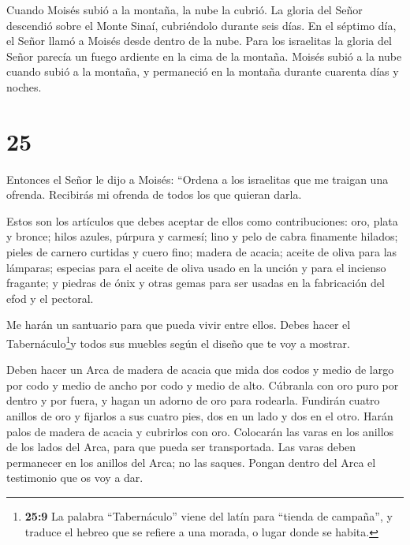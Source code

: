  Cuando Moisés subió a la montaña, la nube la cubrió.
 La gloria del Señor descendió sobre el Monte Sinaí,
cubriéndolo durante seis días. En el séptimo día, el Señor llamó a
Moisés desde dentro de la nube.  Para los israelitas la
gloria del Señor parecía un fuego ardiente en la cima de la montaña.
 Moisés subió a la nube cuando subió a la montaña, y
permaneció en la montaña durante cuarenta días y noches.

\hypertarget{section-24}{%
\section{25}\label{section-24}}

 Entonces el Señor le dijo a Moisés:  ``Ordena a
los israelitas que me traigan una ofrenda. Recibirás mi ofrenda de todos
los que quieran darla.

 Estos son los artículos que debes aceptar de ellos como
contribuciones: oro, plata y bronce;  hilos azules, púrpura
y carmesí; lino y pelo de cabra finamente hilados;  pieles
de carnero curtidas y cuero fino; madera de acacia;  aceite
de oliva para las lámparas; especias para el aceite de oliva usado en la
unción y para el incienso fragante;  y piedras de ónix y
otras gemas para ser usadas en la fabricación del efod y el pectoral.

 Me harán un santuario para que pueda vivir entre ellos.
 Debes hacer el Tabernáculo\footnote{\textbf{25:9} La
  palabra ``Tabernáculo'' viene del latín para ``tienda de campaña'', y
  traduce el hebreo que se refiere a una morada, o lugar donde se
  habita.}y todos sus muebles según el diseño que te voy a mostrar.

 Deben hacer un Arca de madera de acacia que mida dos codos
y medio de largo por codo y medio de ancho por codo y medio de alto.
 Cúbranla con oro puro por dentro y por fuera, y hagan un
adorno de oro para rodearla.  Fundirán cuatro anillos de
oro y fijarlos a sus cuatro pies, dos en un lado y dos en el otro.
 Harán palos de madera de acacia y cubrirlos con oro.
 Colocarán las varas en los anillos de los lados del Arca,
para que pueda ser transportada.  Las varas deben
permanecer en los anillos del Arca; no las saques.  Pongan
dentro del Arca el testimonio que os voy a dar.


